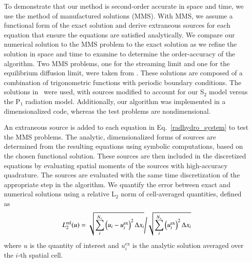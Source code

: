 \documentclass[preprint,12pt]{elsarticle}
\newcommand{\bracket}[1]{\left[ #1 \right]}
\newcommand{\fn}[1]{\left( #1 \right)}
\newcommand{\dxdy}[2]{\frac{\partial #1}{\partial #2}}
\newcommand{\dydt}[1]{\frac{\partial #1}{\partial t}}
\newcommand{\pec}{\, ,}
\newcommand{\pep}{\, .}
\newcommand{\E}{{E_r}}
\newcommand{\F}{{F_r}}
\newcommand{\Q}{\mathcal{Q}}
\begin{document}
To demonstrate that our method is second-order accurate in space and time, we use the method of manufactured solutions (MMS).    
With MMS, we assume a functional form of the exact solution and  derive extraneous sources for each equation that ensure the
equations are satisfied analytically.  We compare our numerical solution to the MMS problem to the exact solution as we refine the
solution in space and time to examine to determine the order-accuracy of the algorithm.  
Two MMS problems, one for the streaming limit and one for the equilibrium diffusion limit, were taken from \cite{mcclarren2}.  These
solutions are composed of a combination of trigonometric functions with periodic boundary conditions.  The solutions in~\cite{mcclarren2}
were used, with sources modified to account for our S$_2$ model versus the P$_1$ radiation model. Additionally, our algorithm was implemented in a
dimensionalized code, whereas the test problems are nondimensional. 

An extraneous source is added
to each equation in Eq.~\eqref{radhydro_system} to test the MMS problems. The analytic,
dimensionalized forms of  sources are determined from the resulting equations using symbolic computations, based on the chosen functional solution.
These sources are then included in the discretized equations by evaluating spatial moments of the sources with high-accuracy quadrature.  The sources are
evaluated with the same time discretization of the appropriate step in the algorithm.  
We quantify the error between exact and numerical solutions using a relative L$_2$ norm of cell-averaged quantities, defined as
\begin{equation}
    \left.  L^{\mathrm{rel}}_2(u) = \sqrt{\sum\limits_i^{N_x} \left(u_i - u_i^{\text{ex}} \right)^2 \Delta x_i} \middle / 
    \sqrt{\sum\limits_i^{N_x} \left(u_i^{\text{ex}}\right)^2 \Delta x_i}  \right.
\end{equation}
where $u$ is the quantity of interest and $u_i^{\text{ex}}$ is the analytic solution averaged over the $i$-th spatial cell.  

\end{document}
